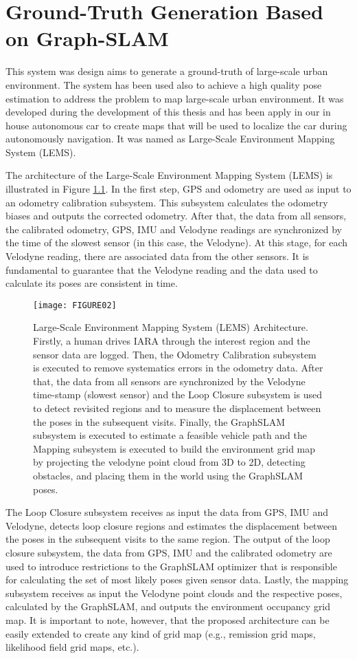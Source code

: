 \chapter{Ground-Truth Generation Based on Graph-SLAM}
\label{sec:Mapping}

This system was design aims to generate a ground-truth of large-scale urban environment. The system has been used also to achieve a high quality pose estimation to address the problem to map large-scale urban environment. It was developed during the development of this thesis and has been apply in our in house autonomous car to create maps that will be used to localize the car during autonomously navigation. It was named as Large-Scale Environment Mapping System (LEMS).
  
The architecture of the Large-Scale Environment Mapping System (LEMS) is illustrated in Figure \ref{Fig::FIGURE02}. In the first step, GPS and odometry are used as input to an odometry calibration subsystem. This subsystem calculates the odometry biases and outputs the corrected odometry. After that, the data from all sensors, the calibrated odometry, GPS, IMU and Velodyne readings are synchronized by the time of the slowest sensor (in this case, the Velodyne). At this stage, for each Velodyne reading, there are associated data from the other sensors. It is fundamental to guarantee that the Velodyne reading and the data used to calculate its poses are  consistent in time.

\begin{figure}[ht]
    \centering
    \texttt{[image: FIGURE02]}
    \caption{Large-Scale Environment Mapping System (LEMS) Architecture. Firstly, a human drives IARA through the interest region and the sensor data are logged. Then, the Odometry Calibration subsystem is executed to remove systematics errors in the odometry data. After that, the data from all sensors are synchronized by the Velodyne time-stamp (slowest sensor) and the Loop Closure subsystem is used to detect revisited regions and to measure the displacement between the poses in the subsequent visits. Finally, the GraphSLAM subsystem is executed to estimate a feasible vehicle path and the Mapping subsystem is executed to build the environment grid map by projecting the velodyne point cloud from 3D to 2D, detecting obstacles, and placing them in the world using the GraphSLAM poses.}
    \label{Fig::FIGURE02}
\end{figure}

The Loop Closure subsystem receives as input the data from GPS, IMU and  Velodyne, detects loop closure regions and estimates the displacement between the poses in the subsequent visits to the same region. The output of the loop closure subsystem, the data from GPS, IMU and the calibrated odometry are used to introduce restrictions to the GraphSLAM optimizer that is responsible for calculating the set of most likely poses given sensor data. Lastly, the mapping subsystem receives as input the Velodyne point clouds and the respective poses, calculated by the GraphSLAM, and outputs the environment occupancy grid map. It is important to note, however, that the proposed architecture can be easily extended to create any kind of grid map (e.g., remission grid maps, likelihood field grid maps, etc.).

